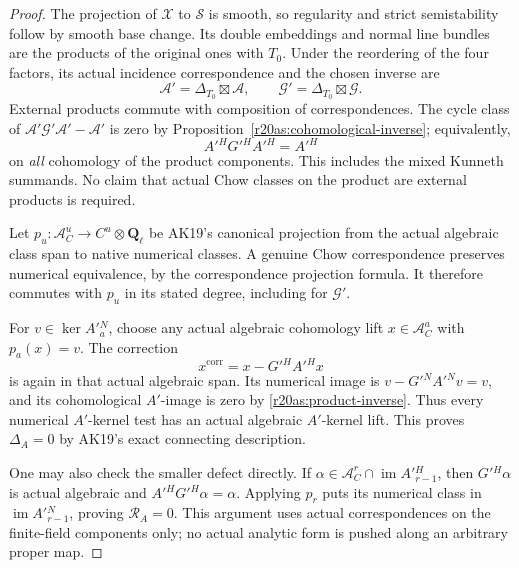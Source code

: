 \begin{proof}
The projection of $\mathcal X$ to $\mathcal S$ is smooth, so
regularity and strict semistability follow by smooth base change.
Its double embeddings and normal line bundles are the products of
the original ones with $T_0$.  Under the reordering of the four
factors, its actual incidence correspondence and the chosen inverse
are
\[
        \mathcal A'=\Delta_{T_0}\boxtimes\mathcal A,
        \qquad
        \mathcal G'=\Delta_{T_0}\boxtimes\mathcal G.
 \tag{AS20.8}
\]
External products commute with composition of correspondences.
The cycle class of
$\mathcal A'\mathcal G'\mathcal A'-\mathcal A'$
is zero by Proposition~\ref{r20as:cohomological-inverse}; equivalently,
\[
                    A'{}^H G'{}^H A'{}^H=A'{}^H
 \tag{AS20.9}\label{r20as:product-inverse}
\]
on \emph{all} cohomology of the product components.  This includes
the mixed Kunneth summands.  No claim that actual Chow classes on
the product are external products is required.

Let $p_u:\mathscr A_C^u\to C^u\otimes\mathbf Q_\ell$ be AK19's
canonical projection from the actual algebraic class span to native
numerical classes.  A genuine Chow correspondence preserves
numerical equivalence, by the correspondence projection formula.
It therefore commutes with $p_u$ in its stated degree, including
for $\mathcal G'$.

For $v\in\ker A'{}^N_a$, choose any actual algebraic cohomology
lift $x\in\mathscr A_C^a$ with $p_a(x)=v$.  The correction
\[
                         x^{\mathrm{corr}}=x-G'{}^H A'{}^H x
 \tag{AS20.10}\label{r20as:actual-correction}
\]
is again in that actual algebraic span.  Its numerical image is
$v-G'{}^N A'{}^N v=v$, and its cohomological $A'$-image is zero
by \eqref{r20as:product-inverse}.  Thus every numerical $A'$-kernel
test has an actual algebraic $A'$-kernel lift.  This proves
$\Delta_A=0$ by AK19's exact connecting description.

One may also check the smaller defect directly.  If
$\alpha\in\mathscr A_C^r\cap\operatorname{im}A'{}^H_{r-1}$,
then $G'{}^H\alpha$ is actual algebraic and
$A'{}^H G'{}^H\alpha=\alpha$.  Applying $p_r$ puts its numerical
class in $\operatorname{im}A'{}^N_{r-1}$, proving
$\mathscr R_A=0$.  This argument uses actual correspondences on
the finite-field components only; no actual analytic form is pushed
along an arbitrary proper map.
\end{proof}

